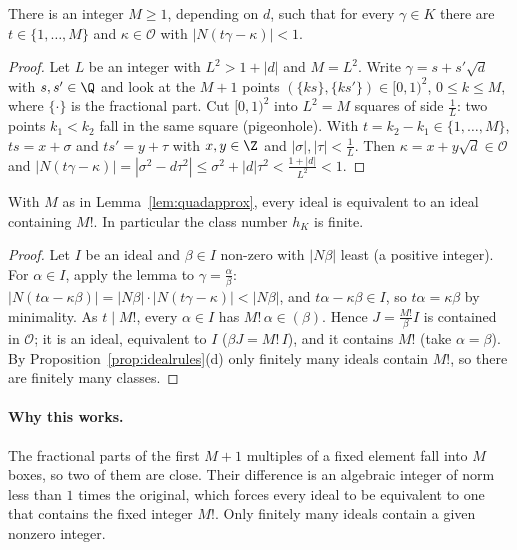 \begin{lemma}\label{lem:quadapprox}
There is an integer $M\ge1$, depending on $d$, such that for every $\gamma\in K$ there are $t\in\{1,\dots,M\}$ and $\kappa\in\mathcal O$ with $|N(t\gamma-\kappa)|<1$.
\end{lemma}
\begin{proof}
Let $L$ be an integer with $L^2>1+|d|$ and $M=L^2$. Write $\gamma=s+s'\sqrt d$ with $s,s'\in\Q$ and look at the $M+1$ points $(\{ks\},\{ks'\})\in[0,1)^2$, $0\le k\le M$, where $\{\cdot\}$ is the fractional part. Cut $[0,1)^2$ into $L^2=M$ squares of side $\frac1L$: two points $k_1<k_2$ fall in the same square (pigeonhole). With $t=k_2-k_1\in\{1,\dots,M\}$, $ts=x+\sigma$ and $ts'=y+\tau$ with $x,y\in\Z$ and $|\sigma|,|\tau|<\frac1L$. Then $\kappa=x+y\sqrt d\in\mathcal O$ and $|N(t\gamma-\kappa)|=|\sigma^2-d\tau^2|\le\sigma^2+|d|\tau^2<\frac{1+|d|}{L^2}<1$.
\end{proof}

\begin{theorem}\label{thm:classfinite}
With $M$ as in Lemma~\ref{lem:quadapprox}, every ideal is equivalent to an ideal containing $M!$. In particular the class number $h_K$ is finite.
\end{theorem}
\begin{proof}
Let $I$ be an ideal and $\beta\in I$ non-zero with $|N\beta|$ least (a positive integer). For $\alpha\in I$, apply the lemma to $\gamma=\frac\alpha\beta$: $|N(t\alpha-\kappa\beta)|=|N\beta|\cdot|N(t\gamma-\kappa)|<|N\beta|$, and $t\alpha-\kappa\beta\in I$, so $t\alpha=\kappa\beta$ by minimality. As $t\mid M!$, every $\alpha\in I$ has $M!\,\alpha\in(\beta)$. Hence $J=\frac{M!}\beta I$ is contained in $\mathcal O$; it is an ideal, equivalent to $I$ ($\beta J=M!\,I$), and it contains $M!$ (take $\alpha=\beta$). By Proposition~\ref{prop:idealrules}(d) only finitely many ideals contain $M!$, so there are finitely many classes.
\end{proof}

\paragraph{Why this works.}
The fractional parts of the first $M+1$ multiples of a fixed element fall into $M$ boxes, so two of them are close. Their difference is an algebraic integer of norm less than $1$ times the original, which forces every ideal to be equivalent to one that contains the fixed integer $M!$. Only finitely many ideals contain a given nonzero integer.

